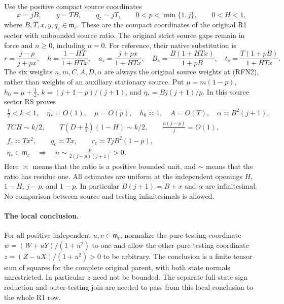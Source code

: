 Use the positive compact source coordinates
\[
 x=jB,\qquad y=TB,\qquad q_z=jT,\qquad
 0<p<\min\{1,j\},\qquad 0<H<1,                         \tag{RFN1}
\]
where $B,T,x,y,q_z\in\mathfrak m_c$.  These are the compact coordinates
of the original R1 sector with unbounded source ratio.  The original
strict source gaps remain in force and $n\geq0$, including $n=0$.
For reference, their native substitution is
\[
 r=\frac{j-p}{j+px},\quad
 h=\frac{1-HT}{1+HTx},\quad
 a_s=\frac{j+px}{1+HTx},\quad
 B_s=\frac{B(1+HTx)}{1+pB},\quad
 t_s=\frac{T(1+pB)}{1+HTx}.                              \tag{RFN2}
\]
The six weights $n,m,C,A,D,\alpha$ are always the original source
weights at (RFN2), rather than weights of an auxiliary stationary
source.  Put $\mu=m(1-p)$, $h_0=\mu+\tfrac12$,
$k=(j+1-p)/(j+1)$, and $\eta_*=Bj(j+1)/p$.
In this source sector RS proves
\begin{gather}
 \tfrac12<k<1,\quad \eta_*=O(1),\quad
 \mu=O(p),\quad h_0\asymp1,\quad A=O(T),\quad
 \alpha\asymp B^2(j+1),                                  \tag{RFN3a}\\
 TCH\sim k/2,\qquad T(D+\tfrac12)(1-H)\sim k/2,\qquad
 \frac{n(j-p)}j=O(1),                                   \tag{RFN3b}\\
 f_c\asymp Tx^2,\qquad q_c\asymp Tx,\qquad
 r_c\asymp TjB^2(1-p),                                  \tag{RFN3c}\\
 \eta_*\in\mathfrak m_c\quad\Longrightarrow\quad
 n\sim\frac{p}{2(j-p)(j+1)}>0.                           \tag{RFN3d}
\end{gather}
Here $\asymp$ means that the ratio is a positive bounded unit, and
$\sim$ means that the ratio has residue one.  All estimates are uniform
at the independent openings $H$, $1-H$, $j-p$, and $1-p$.
In particular $B(j+1)=B+x$ and $\alpha$ are infinitesimal.
No comparison between source and testing infinitesimals is allowed.

\paragraph{The local conclusion.}
For all positive independent $u,v\in\mathfrak m_t$, normalize the pure
testing coordinate $w=(W+uY)/(1+u^2)$ to one and allow the other pure
testing coordinate $z=(Z-uX)/(1+u^2)>0$ to be arbitrary.  The conclusion
is a finite tensor sum of squares for the complete original parent,
with both state normals unrestricted.  In particular $z$ need not be
bounded.  The separate full-state sign reduction and outer-testing join
are needed to pass from this local conclusion to the whole R1 row.

